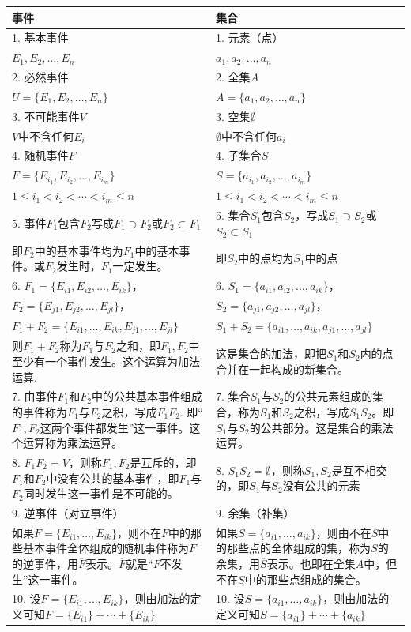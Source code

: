 \begin{longtable}{p{}p{}}
\hline
事件& 集合\\
\hline
1. 基本事件  &1. 元素（点）\\
$E_1,E_2,\ldots, E_n$ &$a_1,a_2,\ldots,a_n$\\
\hline
2. 必然事件 & 2. 全集$A$\\
$U=\{ E_1,E_2,\ldots, E_n\}$ & $A=\{a_1,a_2,\ldots,a_n\}$\\
\hline
3. 不可能事件$V$  &  3. 空集$\emptyset$\\
$V$中不含任何$E_i$& $\emptyset$中不含任何$a_i$\\
\hline
4. 随机事件$F$ &  4. 子集合$S$\\
$F=\{E_{i_1},E_{i_2},\ldots,E_{i_m}\}$&$S=\{a_{i_1},a_{i_2},\ldots,a_{i_m}\}$\\
$1\le i_1< i_2<\cdots <{i_m}\le n$&$1\le i_1<i_2<\cdots<i_m\le n$\\
\hline
5. 事件$F_1$包含$F_2$写成$F_1\supset F_2$或$F_2\subset F_1$  &  5. 集合$S_1$包含$S_2$，写成$S_1\supset S_2$或$S_2\subset S_1$\\
即$F_2$中的基本事件均为$F_1$中的基本事件。或$F_2$发生时，$F_1$一定发生。 &即$S_2$中的点均为$S_1$中的点\\
\hline
6. $F_1=\{E_{i1},E_{i2},\ldots,E_{ik}\}$，&   6. $S_1=\{a_{i1},a_{i2},\ldots,a_{ik}\}$，\\
$F_2=\{E_{j1},E_{j2},\ldots,E_{jl}\}$，& $S_2=\{a_{j1},a_{j2},\ldots,a_{jl}\}$，\\
\small $F_1+F_2=\{E_{i1},\ldots,E_{ik}, E_{j1},\ldots,E_{jl}\}$  &$S_1+S_2=\{a_{i1},\ldots,a_{ik},a_{j1},\ldots,a_{jl}\}$\\
则$F_1+F_2$称为$F_1$与$F_2$之和，即$F_1, F_2$中至少有一个事件发生。这个运算为加法运算.
& 这是集合的加法，即把$S_1$和$S_2$内的点合并在一起构成的新集合。\\
\hline
7. 由事件$F_1$和$F_2$中的公共基本事件组成的事件称为$F_1$与$F_2$之积，写成$F_1F_2$. 即“$F_1,F_2$这两个事件都发生”这一事件。这个运算称为乘法运算。&7. 集合$S_1$与$S_2$的公共元素组成的集合，称为$S_1$和$S_2$之积，写成$S_1S_2$。即$S_1$与$S_2$的公共部分。这是集合的乘法运算。\\
\hline
8. $F_1F_2=V$，则称$F_1,F_2$是互斥的，即$F_1$和$F_2$中没有公共的基本事件，即$F_1$与$F_2$同时发生这一事件是不可能的。&
8. $S_1S_2=\emptyset$，则称$S_1,S_2$是互不相交的，即$S_1$与$S_2$没有公共的元素
\\
\hline
9. 逆事件（对立事件）&9. 余集（补集）\\
如果$F=\{E_{i1},\ldots,E_{ik}\}$，则不在$F$中的那些基本事件全体组成的随机事件称为$F$的逆事件，用$\overline{F}$表示。$\overline{F}$就是“$F$不发生”这一事件。
& 
如果$S=\{a_{i1},\ldots,a_{ik}\}$，则由不在$S$中的那些点的全体组成的集，称为$S$的余集，用$\overline{S}$表示。也即在全集$A$中，但不在$S$中的那些点组成的集合。\\
\hline
10. 设$F=\{E_{i1},\ldots,E_{ik}\}$，则由加法的定义可知$F=\{E_{i1}\}+\cdots +\{E_{ik}\}$ & 10. 设$S=\{a_{i1},\ldots,a_{ik}\}$，则由加法的定义可知$S=\{a_{i1}\}+\cdots+\{a_{ik}\}$\\
\hline
\end{longtable}

